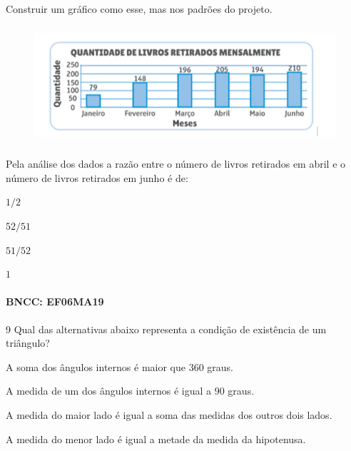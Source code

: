 Construir um gráfico como esse, mas nos padrões do projeto.

\begin{figure}
\includegraphics[width=5in,height=1.71875in]{./imgSAEB_6_MAT/media/image117.png}
\end{figure}

Pela análise dos dados a razão entre o número de livros retirados em
abril e o número de livros retirados em junho é de:

\begin{escolha}
\item $1/2$
\item $52/51$
\item $51/52$
\item $1$
\end{escolha}

\paragraph{BNCC: EF06MA19}


\num{9}  Qual das alternativas abaixo representa a condição de existência de
um triângulo?

\begin{escolha}
\item A soma dos ângulos internos é maior que $360$ graus. 
\item A medida de um
dos ângulos internos é igual a $90$ graus. 
\item A medida do maior lado é
igual a soma das medidas dos outros dois lados. 
\item A medida do menor
lado é igual a metade da medida da hipotenusa.
\end{escolha}

